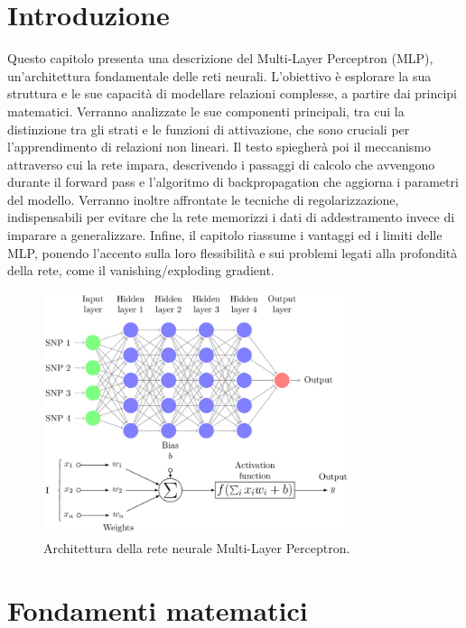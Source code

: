 \documentclass[a4paper,12pt]{report}
\begin{document}
	\section{Introduzione}
	Questo capitolo presenta una descrizione del Multi-Layer Perceptron (MLP), un'architettura fondamentale delle reti neurali. L'obiettivo è esplorare la sua struttura e le sue capacità di modellare relazioni complesse, a partire dai principi matematici. Verranno analizzate le sue componenti principali, tra cui la distinzione tra gli strati e le funzioni di attivazione, che sono cruciali per l'apprendimento di relazioni non lineari. Il testo spiegherà poi il meccanismo attraverso cui la rete impara, descrivendo i passaggi di calcolo che avvengono durante il forward pass e l'algoritmo di backpropagation che aggiorna i parametri del modello. Verranno inoltre affrontate le tecniche di regolarizzazione, indispensabili per evitare che la rete memorizzi i dati di addestramento invece di imparare a generalizzare. Infine, il capitolo riassume i vantaggi ed i limiti delle MLP, ponendo l'accento sulla loro flessibilità e sui problemi legati alla profondità della rete, come il vanishing/exploding gradient. \cite{popescu2009mlp, hornick1988mfn, cybenko1989uat, leshno1993uat, henseler1995back, srivastava2014dropout, schmidhuber2015deep}
	
	\begin{figure}[H]
		\centering
		\includegraphics[width=0.8\textwidth]{img/mlp.png}
		\caption{Architettura della rete neurale Multi-Layer Perceptron.}
	\end{figure}
	
	\section{Fondamenti matematici}
	
\end{document}

